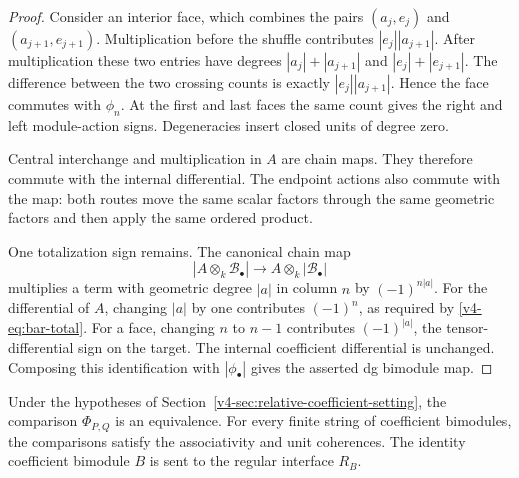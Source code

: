 \begin{proof}
Consider an interior face, which combines the pairs
\((a_j,e_j)\) and \((a_{j+1},e_{j+1})\).
Multiplication before the shuffle contributes
\(|e_j||a_{j+1}|\). After multiplication these two entries
have degrees \(|a_j|+|a_{j+1}|\) and
\(|e_j|+|e_{j+1}|\). The difference between the two crossing
counts is exactly \(|e_j||a_{j+1}|\). Hence the face commutes
with \(\phi_n\). At the first and last faces the same count
gives the right and left module-action signs. Degeneracies
insert closed units of degree zero.

Central interchange and multiplication in \(A\) are chain
maps. They therefore commute with the internal differential.
The endpoint actions also commute with the map: both routes
move the same scalar factors through the same geometric
factors and then apply the same ordered product.

One totalization sign remains. The canonical chain map
\[
 |A\otimes_k\mathcal B_\bullet|
       \longrightarrow A\otimes_k|\mathcal B_\bullet|
\]
multiplies a term with geometric degree \(|a|\) in column
\(n\) by \((-1)^{n|a|}\).
For the differential of \(A\), changing \(|a|\) by one
contributes \((-1)^n\), as required by
\eqref{v4-eq:bar-total}. For a face, changing \(n\) to \(n-1\)
contributes \((-1)^{|a|}\), the tensor-differential sign on
the target. The internal coefficient differential is
unchanged. Composing this identification with
\(|\phi_\bullet|\) gives the asserted dg bimodule map.
\end{proof}

\begin{theorem}
\label{v4-thm:relative-composition}
Under the hypotheses of
Section~\ref{v4-sec:relative-coefficient-setting},
the comparison \(\Phi_{P,Q}\) is an equivalence.
For every finite string of coefficient bimodules, the
comparisons satisfy the associativity and unit coherences.
The identity coefficient bimodule \(B\) is sent to the
regular interface \(R_B\).
\end{theorem}

